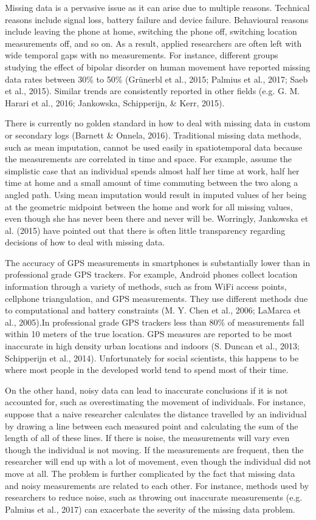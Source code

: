 \documentclass[english,man]{apa6}
\theoremstyle{definition}
\theoremstyle{definition}
\theoremstyle{definition}
\theoremstyle{remark}
\begin{document}
Missing data is a pervasive issue as it can arise due to multiple
reasons. Technical reasons include signal loss, battery failure and
device failure. Behavioural reasons include leaving the phone at home,
switching the phone off, switching location measurements off, and so on.
As a result, applied researchers are often left with wide temporal gaps
with no measurements. For instance, different groups studying the effect
of bipolar disorder on human movement have reported missing data rates
between 30\% to 50\% (Grünerbl et al., 2015; Palmius et al., 2017; Saeb
et al., 2015). Similar trends are consistently reported in other fields
(e.g. G. M. Harari et al., 2016; Jankowska, Schipperijn, \& Kerr, 2015).

There is currently no golden standard in how to deal with missing data
in custom or secondary logs (Barnett \& Onnela, 2016). Traditional
missing data methods, such as mean imputation, cannot be used easily in
spatiotemporal data because the measurements are correlated in time and
space. For example, assume the simplistic case that an individual spends
almost half her time at work, half her time at home and a small amount
of time commuting between the two along a angled path. Using mean
imputation would result in imputed values of her being at the geometric
midpoint between the home and work for all missing values, even though
she has never been there and never will be. Worringly, Jankowska et al.
(2015) have pointed out that there is often little transparency
regarding decisions of how to deal with missing data.

The accuracy of GPS measurements in smartphones is substantially lower
than in professional grade GPS trackers. For example, Android phones
collect location information through a variety of methods, such as from
WiFi access points, cellphone triangulation, and GPS measurements. They
use different methods due to computational and battery constraints (M.
Y. Chen et al., 2006; LaMarca et al., 2005).In professional grade GPS
trackers less than 80\% of measurements fall within 10 meters of the
true location. GPS measures are reported to be most inaccurate in high
density urban locations and indoors (S. Duncan et al., 2013; Schipperijn
et al., 2014). Unfortunately for social scientists, this happens to be
where most people in the developed world tend to spend most of their
time.

On the other hand, noisy data can lead to inaccurate conclusions if it
is not accounted for, such as overestimating the movement of
individuals. For instance, suppose that a naive researcher calculates
the distance travelled by an individual by drawing a line between each
measured point and calculating the sum of the length of all of these
lines. If there is noise, the measurements will vary even though the
individual is not moving. If the measurements are frequent, then the
researcher will end up with a lot of movement, even though the
individual did not move at all. The problem is further complicated by
the fact that missing data and noisy measurements are related to each
other. For instance, methods used by researchers to reduce noise, such
as throwing out inaccurate measurements (e.g. Palmius et al., 2017) can
exacerbate the severity of the missing data problem.
\end{document}
